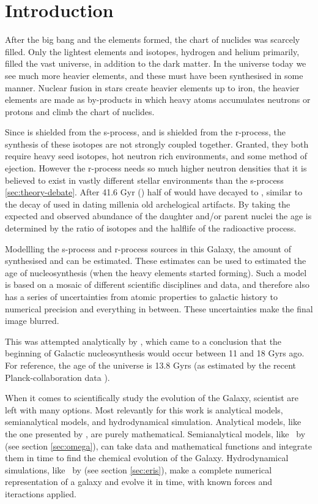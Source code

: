 \chapter{Introduction}
\label{sec:introduction}

After the big bang and the elements formed, the chart of nuclides was scarcely filled.
Only the lightest elements and isotopes, hydrogen and helium primarily, filled the vast universe\cite{alphabetagamma}, in addition to the dark matter.
In the universe today we see much more heavier elements, and these must have been synthesised in some manner.
Nuclear fusion in stars create heavier elements up to iron, the heavier elements are made as by-products in which heavy atoms accumulates neutrons or protons and climb the chart of nuclides\cite{BBFH}.

Since  is shielded from the s-process, and  is shielded from the r-process, the synthesis of these isotopes are not
strongly coupled together. Granted, they both require heavy seed isotopes, hot neutron rich environments, and some method of ejection.
However the r-process needs so much higher neutron densities that it is believed to exist in vastly different stellar environments than the s-process \ref{sec:theory-debate}.
After 41.6 Gyr () half of  would have decayed to , similar to the decay of  used in dating millenia old archelogical artifacts.
By taking the expected and observed abundance of the daughter and/or parent nuclei the age is determined by the ratio of isotopes and the halflife of the radioactive process.

Modellling the s-process and r-process sources in this Galaxy, the amount of synthesised  and  can be estimated.
These estimates can be used to estimated the age of nucleosynthesis (when the heavy elements started forming).
Such a model is based on a mosaic of different scientific disciplines and data, and therefore also has a series of uncertainties from atomic properties to galactic history to numerical precision and everything in between.
These uncertainties make the final image blurred.

This was attempted analytically by , which came to a conclusion that the beginning of Galactic nucleosynthesis would occur between 11 and 18 Gyrs ago.
For reference, the age of the universe is 13.8 Gyrs (as estimated by the recent Planck-collaboration data ).

When it comes to scientifically study the evolution of the Galaxy, scientist are left with many options.
Most relevantly for this work is analytical models, semianalytical models, and hydrodynamical simulation.
Analytical models, like the one presented by , are purely mathematical.
Semianalytical models, like \omegamodel\ by  (see section \ref{sec:omega}), can take data and mathematical functions and integrate them in time to find the chemical evolution of the Galaxy.
Hydrodynamical simulations, like \eris\ by  (see section \ref{sec:eris}), make a complete numerical representation of a galaxy and evolve it in time, with known forces and iteractions applied.

